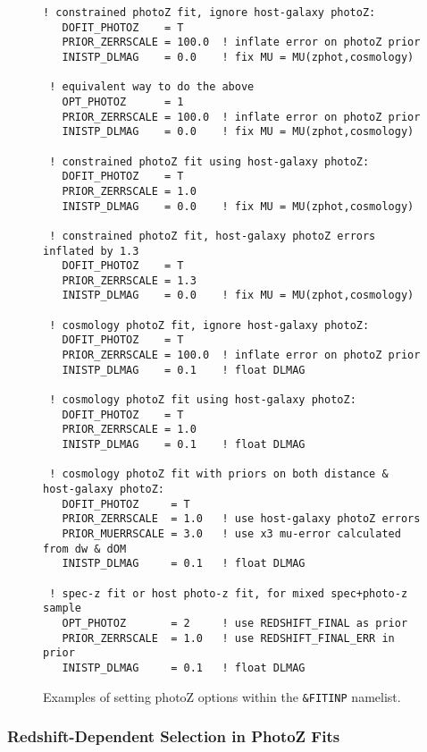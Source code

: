 \documentclass[12pt]{article}
\begin{document}
\begin{figure}[hb] 
\begin{center}
\caption{
  Examples of setting photoZ options within the
  {\tt \&FITINP} namelist.
 }
\label{fig:photoZ}
%
\begin{Verbatim}[frame=single]
 ! constrained photoZ fit, ignore host-galaxy photoZ:
   DOFIT_PHOTOZ    = T
   PRIOR_ZERRSCALE = 100.0  ! inflate error on photoZ prior
   INISTP_DLMAG    = 0.0    ! fix MU = MU(zphot,cosmology)

 ! equivalent way to do the above
   OPT_PHOTOZ      = 1
   PRIOR_ZERRSCALE = 100.0  ! inflate error on photoZ prior
   INISTP_DLMAG    = 0.0    ! fix MU = MU(zphot,cosmology)

 ! constrained photoZ fit using host-galaxy photoZ:
   DOFIT_PHOTOZ    = T
   PRIOR_ZERRSCALE = 1.0
   INISTP_DLMAG    = 0.0    ! fix MU = MU(zphot,cosmology)

 ! constrained photoZ fit, host-galaxy photoZ errors inflated by 1.3
   DOFIT_PHOTOZ    = T
   PRIOR_ZERRSCALE = 1.3
   INISTP_DLMAG    = 0.0    ! fix MU = MU(zphot,cosmology)

 ! cosmology photoZ fit, ignore host-galaxy photoZ:
   DOFIT_PHOTOZ    = T
   PRIOR_ZERRSCALE = 100.0  ! inflate error on photoZ prior
   INISTP_DLMAG    = 0.1    ! float DLMAG

 ! cosmology photoZ fit using host-galaxy photoZ:
   DOFIT_PHOTOZ    = T
   PRIOR_ZERRSCALE = 1.0   
   INISTP_DLMAG    = 0.1    ! float DLMAG

 ! cosmology photoZ fit with priors on both distance & host-galaxy photoZ:
   DOFIT_PHOTOZ     = T
   PRIOR_ZERRSCALE  = 1.0   ! use host-galaxy photoZ errors   
   PRIOR_MUERRSCALE = 3.0   ! use x3 mu-error calculated from dw & dOM
   INISTP_DLMAG     = 0.1   ! float DLMAG

 ! spec-z fit or host photo-z fit, for mixed spec+photo-z sample
   OPT_PHOTOZ       = 2     ! use REDSHIFT_FINAL as prior
   PRIOR_ZERRSCALE  = 1.0   ! use REDSHIFT_FINAL_ERR in prior
   INISTP_DLMAG     = 0.1   ! float DLMAG
\end{Verbatim}
\end{center}
\end{figure}



   \clearpage
   \subsubsection{Redshift-Dependent Selection in PhotoZ Fits}
   \label{sss:dropfilter_photoz}
\end{document}
